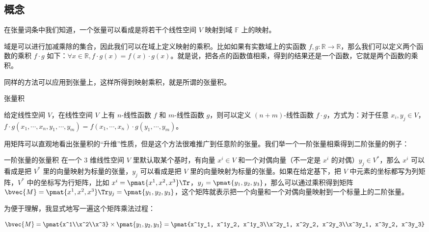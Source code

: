 
\begin{issues}
\end{issues}



\subsection{概念}
在张量词条中我们知道，一个张量可以看成是将若干个线性空间 $V$ 映射到域 $\mathbb{F}$ 上的映射。

域是可以进行加减乘除的集合，因此我们可以在域上定义映射的乘积。比如如果有实数域上的实函数 $f, g:\mathbb{R} \rightarrow \mathbb{R}$，那么我们可以定义两个函数的乘积 $f \cdot g$ 如下：$\forall x \in \mathbb{R}, f \cdot g(x) = f(x) \cdot g(x)$。就是说，把各点的函数值相乘，得到的结果还是一个函数，它就是两个函数的乘积。

同样的方法可以应用到张量上，这样所得到映射乘积，就是所谓的张量积。

\begin{definition}{张量积}\label{TsrPrd_def1}

给定线性空间 $V$，在线性空间 $V$ 上有 $n$-线性函数 $f$ 和 $m$-线性函数 $g$，则可以定义 $(n+m)$-线性函数 $f\cdot g$，方式为：对于任意 $x_i, y_j\in V$，$f\cdot g(x_1, \cdots, x_n, y_1, \cdots, y_m)=f(x_1, \cdots, x_n)\cdot g(y_1, \cdots, y_m)$。

\end{definition}

用矩阵可以直观地看出张量积的“升维”性质，但是这个方法很难推广到任意阶的张量。我们举一个一阶张量相乘得到二阶张量的例子：

\begin{example}{一阶张量的张量积}
在一个 $3$ 维线性空间 $V$ 里默认取某个基时，有向量 $x^i\in V$ 和一个对偶向量（不一定是 $x^i$ 的对偶）$y_j\in V^*$，那么 $x^i$ 可以看成是把 $V^*$ 里的向量映射为标量的张量，$y_j$ 可以看成是把 $V$ 里的向量映射为标量的张量。如果在给定基下，把 $V$ 中元素的坐标都写为列矩阵，$V^*$ 中的坐标写为行矩阵，比如 $x^i=\pmat{x^1, x^2, x^3}\Tr$，$y_j=\pmat{y_1, y_2, y_3}$，那么可以通过乘积得到矩阵 $\bvec{M}=\pmat{x^1, x^2, x^3}\Tr y_j=\pmat{y_1, y_2, y_3}$，这个矩阵就表示把一个向量和一个对偶向量映射到一个标量上的二阶张量。

为便于理解，我显式地写一遍这个矩阵乘法过程：

\begin{equation}
\bvec{M}=\pmat{x^1\\x^2\\x^3}\times\pmat{y_1, y_2, y_3}=\pmat{x^1y_1, x^1y_2, x^1y_3\\x^2y_1, x^2y_2, x^2y_3\\x^3y_1, x^3y_2, x^3y_3}
\end{equation}
\end{example}

